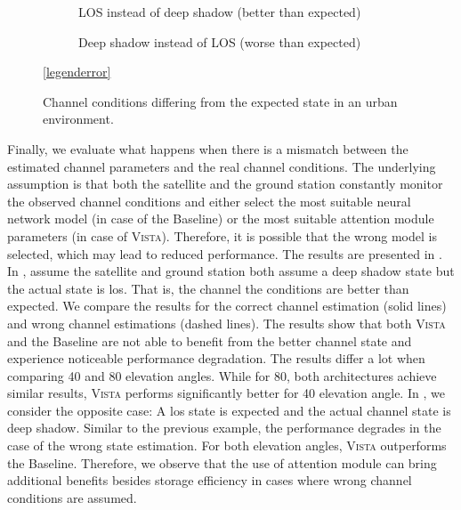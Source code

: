 \documentclass[conference]{IEEEtran}
\newcommand\ours{\textsc{Vista}\xspace}
\newcommand\baseline{Baseline\xspace}
\begin{document}
\begin{figure}[t!]
  \begin{subfigure}{.48\linewidth}
  \centering
  
  \caption{LOS instead of deep shadow (better than expected)}
  \label{fig:different_state_same_snr_better}
\end{subfigure}
\hfill
\begin{subfigure}{.48\linewidth}
  \centering
  
  \caption{Deep shadow instead of LOS (worse than expected)}
  \label{fig:different_state_same_snr_worse}
\end{subfigure}

\vspace{1em}
\centering
\ref{legenderror}

\caption{Channel conditions differing from the expected state in an urban environment.}
\label{fig:different_state_same_snr}
\end{figure}

Finally, we evaluate what happens when there is a mismatch between the estimated channel parameters and the real channel conditions. 
The underlying assumption is that both the satellite and the ground station constantly monitor the observed channel conditions and either select the most suitable neural network model (in case of the \baseline) or the most suitable attention module parameters (in case of \ours).
Therefore, it is possible that the wrong model is selected, which may lead to reduced performance.
The results are presented in .
In , assume the satellite and ground station both assume a deep shadow state but the actual state is \ac{los}. 
That is, the channel the conditions are better than expected. 
We compare the results for the correct channel estimation (solid lines) and wrong channel estimations (dashed lines).
The results show that both \ours and the \baseline are not able to benefit from the better channel state and experience noticeable performance degradation.
The results differ a lot when comparing 40\textdegree{} and 80\textdegree{} elevation angles.
While for 80\textdegree{}, both architectures achieve similar results, 
\ours performs significantly better for 40\textdegree{} elevation angle.
In , we consider the opposite case: 
A \ac{los} state is expected and the actual channel state is deep shadow. 
Similar to the previous example, the performance degrades in the case of the wrong state estimation.
For both elevation angles, \ours outperforms the \baseline.
Therefore, we observe that the use of attention module can bring additional benefits besides storage efficiency in cases where wrong channel conditions are assumed.
\end{document}
